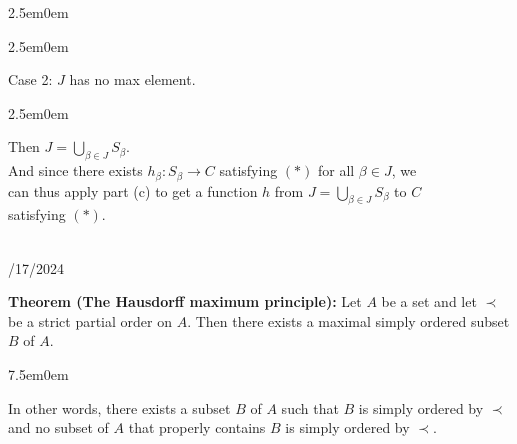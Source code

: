\documentclass{book}
\newcommand{\hOne}{%
   \color{Black}%
   \fontsize{14}{16}\selectfont%
}
\newcommand{\hThree}{%
   \color{Black}%
   \fontsize{12}{14}\selectfont%
}
\newenvironment{myIndent}{%
   \begin{adjustwidth}{2.5em}{0em}%
}{%
   \end{adjustwidth}%
}
\newenvironment{myTindent}{%
   \begin{adjustwidth}{7.5em}{0em}%
}{%
   \end{adjustwidth}%
}
\newcommand{\blab}[1]{\textbf{#1}}
\newcommand{\mySepTwo}[1][.]{%
   {\noindent\color{#1}{\rule{6.5in}{0.5mm}}}\\%
}
\newcommand{\retTwo}{\hfill\bigbreak}
\newcommand{\dispDate}[1]{{
   \color{Black}%
   \fontsize{20}{18}\selectfont%
   #1\retTwo
}}
\begin{document}
\begin{myIndent}
\begin{itemize}
\begin{myIndent}
            Case 2: $J$ has no max element.
            \begin{myIndent}
               Then $J = \bigcup\limits_{\beta \in J}S_\beta$.\\ And since there exists $h_\beta: S_\beta \longrightarrow C$ satisfying $(*)$ for all $\beta \in J$, we\\ can thus apply part (c) to get a function $h$ from $J = \bigcup\limits_{\beta \in J}S_\beta$ to $C$\\ [-9pt] satisfying $(*)$.\retTwo\retTwo
            \end{myIndent}
         \end{myIndent}
      \end{itemize}
   \end{myIndent}

   \hOne
   \mySepTwo

   \dispDate{9/17/2024}

   \blab{Theorem (The Hausdorff maximum principle):} Let $A$ be a set and let $\prec$ be a strict partial order on $A$. Then there exists a maximal simply ordered subset $B$ of $A$.
   
   \begin{myTindent}\hThree
      In other words, there exists a subset $B$ of $A$ such that $B$ is simply ordered by $\prec$ and no subset of $A$ that properly contains $B$ is simply ordered by $\prec$.\retTwo
   \end{myTindent}
   
\end{document}
